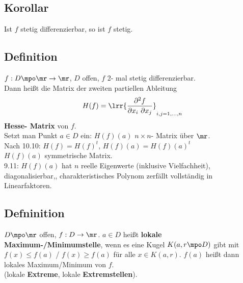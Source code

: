 \subsection{Korollar}
	Ist $f$ stetig differenzierbar, so ist $f$ stetig.

\subsection{Definition}
	$ f: D\mpo\mr\rightarrow\mr $, $ D $ offen, $ f $ 2- mal stetig differenzierbar.\\
	Dann heißt die Matrix der zweiten partiellen Ableitung
	\[ H(f)=\lrr{\dfrac{\partial^2 f}{\partial x_i\ \partial x_j}}_{i,j=1,...,n} \]
	\textbf{Hesse- Matrix} von $ f $.\\
	Setzt man Punkt $ a\in D $ ein: $ H(f)(a) $ $ n\times n $- Matrix über $ \mr $.\\
	Nach 10.10: $ H(f)=H(f)^t $, $ H(f)(a)=H(f)(a)^t $\\
	$ H(f)(a) $ symmetrische Matrix.\\
	9.11: $ H(f)(a) $ hat $ n $ reelle Eigenwerte (inklusive Vielfachheit), diagonalisierbar,, charakteristisches Polynom zerfällt vollständig in Linearfaktoren.
	
\subsection{Defninition}
	$ D\mpo\mr $ offen, $ f:D\rightarrow\mr $. $ a\in D $ heißt \textbf{lokale Maximum-/Minimumstelle}, wenn es eine Kugel $ K(a,r\mpo D) $ gibt mit $ f(x)\leq f(a) $ / $ f(x)\geq f(a) $ für alle $ x\in K(a,r) $. $ f(a) $ heißt dann lokales Maximum/Minimum von $ f $.\\
	(lokale \textbf{Extreme}, lokale \textbf{Extremstellen}).
	
